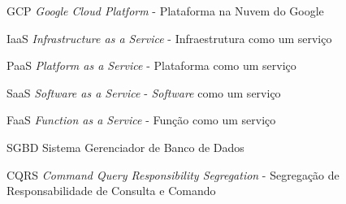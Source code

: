 \begin{siglas}
	\item[GCP]{\emph{Google Cloud Platform} - Plataforma na Nuvem do Google}
	\item[IaaS]{\emph{Infrastructure as a Service} - Infraestrutura como um serviço}
	\item[PaaS]{\emph{Platform as a Service} - Plataforma como um serviço}
	\item[SaaS]{\emph{Software as a Service} - \emph{Software} como um serviço}
	\item[FaaS]{\emph{Function as a Service} - Função como um serviço}
	\item[SGBD]{Sistema Gerenciador de Banco de Dados}
	\item[CQRS]{\emph{Command Query Responsibility Segregation} - Segregação de Responsabilidade de Consulta e Comando}
\end{siglas}